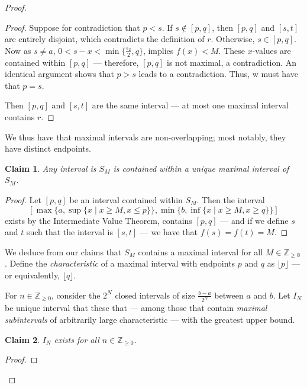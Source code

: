 \documentclass[11pt]{article}
\newtheorem*{claim*}{Claim}
\begin{document}
\begin{proof}
\begin{adjustwidth}{1cm}{}
\begin{proof}
		Suppose for contradiction that $p < s$. If $s \notin [p, q]$, then $[p, q]$ and $[s, t]$ are entirely disjoint, which contradicts the definition of $r$. Otherwise, $s \in [p, q]$. Now as $s \ne a$, $0 < s - x < \min \{ \tfrac{\epsilon_{2}}{2}, q \}$, implies $f(x) < M$. These $x$-values are contained within $[p, q]$ --- therefore, $[p, q]$ is not maximal, a contradiction. An identical argument shows that $p > s$ leads to a contradiction. Thus, w must have that $p = s$.

		Then $[p, q]$ and $[s, t]$ are the same interval --- at most one maximal interval contains $r$.
	\end{proof}
\end{adjustwidth}

We thus have that maximal intervals are non-overlapping; most notably, they have distinct endpoints.

\begin{adjustwidth}{1cm}{}
    \begin{claim*}
    	Any interval is $S_M$ is contained within a unique maximal interval of $S_M$.
    \end{claim*}
    \begin{proof}\renewcommand{\qedsymbol}{}
		Let $[p, q]$ be an interval contained within $S_M$. Then the interval \[ [ \max \{ a, \sup \{ x \mid x \ge M, x \le p \} \}, \min \{ b, \inf \{ x \mid x \ge M, x \ge q \} \}] \] exists by the Intermediate Value Theorem, contains $[p, q]$ --- and if we define $s$ and $t$ such that the interval is $[s, t]$ --- we have that $f(s) = f(t) = M$.
	\end{proof}
\end{adjustwidth}

We deduce from our claims that $S_M$ contains a maximal interval for all $M \in \mathbb{Z_{\ge 0}}$. Define the \textit{characteristic} of a maximal interval with endpoints $p$ and $q$ as $\lfloor p \rfloor$ --- or equivalently, $\lfloor q \rfloor$.

For $n \in \mathbb{Z}_{\ge 0}$, consider the $2^{N}$ closed intervals of size $\tfrac{b-a}{2^N}$ between $a$ and $b$. Let $I_N$ be unique interval that these that --- among those that contain \textit{maximal subintervals} of arbitrarily large characteristic --- with the greatest upper bound.

\begin{adjustwidth}{1cm}{}
    \begin{claim*}
    	$I_N$ exists for all $n \in \mathbb{Z}_{\ge 0}$.
    \end{claim*}
    \begin{proof}\renewcommand{\qedsymbol}{}


\end{proof}
\end{adjustwidth}
\end{proof}
\end{document}
